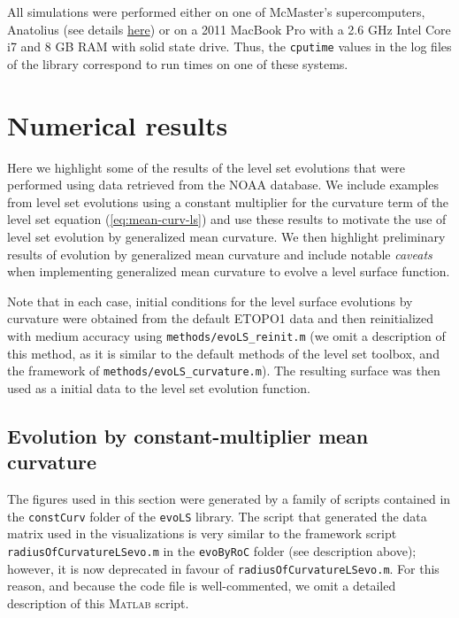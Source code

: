 \documentclass{article}
\begin{document}
All simulations were performed either on one of McMaster's
supercomputers, Anatolius (see details \href{}{here}) or on a 2011
MacBook Pro with a 2.6 GHz Intel Core i7 and 8 GB RAM with solid
state drive. Thus, the \texttt{cputime} values in the log files of
the library correspond to run times on one of these systems.

\section{Numerical results}
\label{sec:numerical-results}

Here we highlight some of the results of the level set evolutions
that were performed using data retrieved from the NOAA
database. We include examples from level set evolutions using a
constant multiplier for the curvature term of the level set
equation (\autoref{eq:mean-curv-ls}) and use these results to
motivate the use of level set evolution by generalized mean
curvature. We then highlight preliminary results of evolution by
generalized mean curvature and include notable \emph{caveats} when
implementing generalized mean curvature to evolve a level surface
function.

Note that in each case, initial conditions for the level surface
evolutions by curvature were obtained from the
default ETOPO1 data and then reinitialized with medium accuracy
using \texttt{methods/evoLS\_reinit.m} (we omit a description of
this method, as it is similar to the default methods of the level
set toolbox, and the framework of \texttt{methods/evoLS\_curvature.m}). The
resulting surface was then used as a initial data to the level
set evolution function. 

\subsection{Evolution by constant-multiplier mean curvature}
\label{sec:evol-const-mult}

The figures used in this section were generated by a family of
scripts contained in the \texttt{constCurv} folder of the
\texttt{evoLS} library. The script that generated the data matrix
used in the visualizations is very similar to the framework script
\texttt{radiusOfCurvatureLSevo.m} in the \texttt{evoByRoC} folder
(see description above); however, it is now deprecated in favour
of \texttt{radiusOfCurvatureLSevo.m}. For this reason, and because
the code file is well-commented, we omit a detailed description of
this \textsc{Matlab} script.
\end{document}
